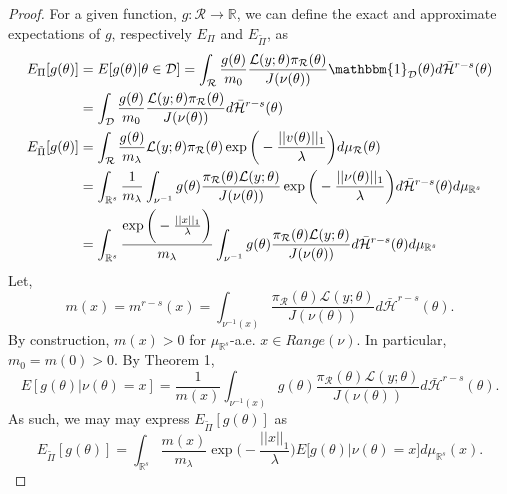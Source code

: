 \documentclass[10pt,fleqn]{article}
\DeclareMathOperator{\1}{\mathbbm{1}}
\begin{document}
{\begin{proof}

For a given function, $g:\mathcal{R}\to\mathbb{R}$, we can define the exact and approximate expectations of $g$, respectively $E_\Pi$ and $E_{\tilde{\Pi}}$, as
\begin{align*}
E_\Pi[g(\theta)] &= E[g(\theta)|\theta\in\mathcal{D}] = \int_\mathcal{R} \frac{g(\theta)}{m_0} \frac{\mathcal{L}(y;\theta)\pi_\mathcal{R}(\theta)}{J(\nu(\theta))}\mathbbm{1}_\mathcal{D}(\theta)d\bar{\mathcal{H}}^{r-s}(\theta) \\
&=\int_\mathcal{D} \frac{g(\theta)}{m_0} \frac{\mathcal{L}(y;\theta)\pi_\mathcal{R}(\theta)}{J(\nu(\theta))}d\bar{\mathcal{H}}^{r-s}(\theta)\\
E_{\tilde{\Pi}}[g(\theta)] &= \int_\mathcal{R}  \frac{g(\theta)}{m_\lambda} \mathcal{L}(y;\theta)\pi_\mathcal{R}(\theta)\exp\bigg(-\frac{||v(\theta)||_1}{\lambda}\bigg)d\mu_\mathcal{R}(\theta) \\
&= \int_{\mathbb{R}^s} \frac{1}{m_\lambda} \int_{\nu^{-1}} g(\theta) \frac{\pi_\mathcal{R}(\theta)\mathcal{L}(y;\theta)}{J(\nu(\theta))} \exp\bigg(-\frac{||\nu(\theta)||_1}{\lambda}\bigg) d\bar{\mathcal{H}}^{r-s}(\theta) d\mu_{\mathbb{R}^s} \\
&=\int_{\mathbb{R}^s} \frac{\exp\bigg(-\frac{||x||_1}{\lambda}\bigg) }{m_\lambda} \int_{\nu^{-1}} g(\theta) \frac{\pi_\mathcal{R}(\theta)\mathcal{L}(y;\theta)}{J(\nu(\theta))} d\bar{\mathcal{H}}^{r-s}(\theta) d\mu_{\mathbb{R}^s} 
\end{align*}
Let, $$m(x) = m^{r-s}(x) = \int_{\nu^{-1}(x)}\frac{\pi_\mathcal{R}(\theta)\mathcal{L}(y;\theta)}{J(\nu(\theta))} d\bar{\mathcal{H}}^{r-s}(\theta) .$$
By construction, $m(x) > 0$ for $\mu_{\mathbb{R}^s}$-a.e. $x\in Range(\nu)$. In particular, $m_0=m(0)>0$. By Theorem 1,
\begin{equation}
E[g(\theta) | \nu(\theta) = x] = \frac{1}{m(x)} \int_{\nu^{-1}(x)} g(\theta)\frac{\pi_\mathcal{R}(\theta)\mathcal{L}(y;\theta)}{J(\nu(\theta))} d\bar{\mathcal{H}}^{r-s}(\theta).
\end{equation}
As such, we may may express $E_{\tilde{\Pi}}[g(\theta)]$ as 
\begin{equation}
E_{\tilde{\Pi}}[g(\theta)] = \int_{\mathbb{R}^s} \frac{m(x)}{m_\lambda}\exp\bigg(-\frac{||x||_1}{\lambda}\bigg) E\big[g(\theta)|\nu(\theta)=x\big] d\mu_{\mathbb{R}^s}(x).
\end{equation}


\end{proof}}
\end{document}
